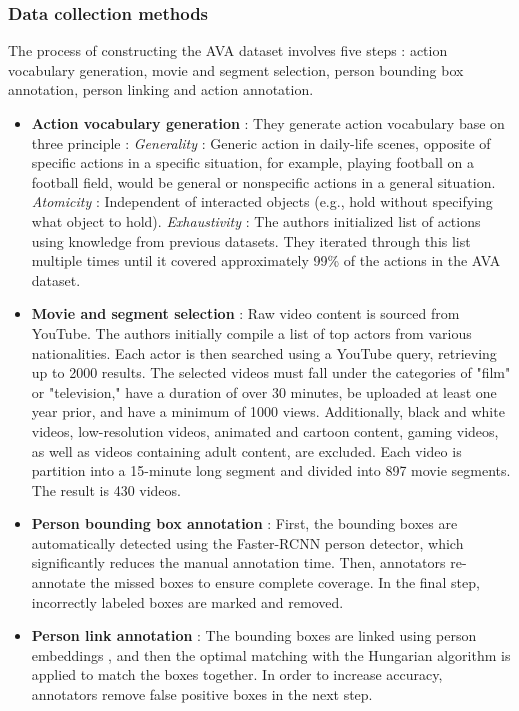 \documentclass[10pt,onecolumn,letterpaper]{article}
\begin{document}
\subsubsection{Data collection methods}

The process of constructing the AVA dataset involves five steps : action
vocabulary generation, movie and segment selection, person bounding box
annotation, person linking and action annotation.

\begin{itemize}
	\item \textbf{Action vocabulary generation} : They generate action vocabulary
	base on three principle :  
	\subitem \textit{Generality} : Generic action in daily-life scenes, opposite of
	specific actions in a specific situation, for example, playing football on a
	football field, would be general or nonspecific actions in a general situation.
	\subitem \textit{Atomicity} : Independent of interacted objects (e.g., hold
	without specifying what object to hold).
	\subitem \textit{Exhaustivity} : The authors initialized list of actions using
	knowledge
	from previous datasets. They iterated through this list multiple times until it
	covered approximately 99\% of the actions in the AVA dataset.
	
	\item \textbf{Movie and segment selection} : Raw video content is sourced from YouTube. The authors initially compile a list of top actors from various nationalities. Each actor is then searched using a YouTube query, retrieving up to 2000 results. The selected videos must fall under the categories of "film" or "television," have a duration of over 30 minutes, be uploaded at least one year prior, and have a minimum of 1000 views. Additionally, black and white videos, low-resolution videos, animated and cartoon content, gaming videos, as well as videos containing adult content, are excluded. Each video is partition into a 15-minute long segment and divided into 897 movie segments. The result is 430 videos.
	
	\item \textbf{Person bounding box annotation} : First, the bounding boxes are automatically detected using the Faster-RCNN \cite{faster-rcnn} person detector, which significantly reduces the manual annotation time. Then, annotators re-annotate the missed boxes to ensure complete coverage. In the final step, incorrectly labeled boxes are marked and removed.
	
	\item \textbf{Person link annotation} : The bounding boxes are linked using person embeddings \cite{personembedding}, and then the optimal matching with the Hungarian algorithm \cite{TheHungarian} is applied to match the boxes together. In order to increase accuracy, annotators remove false positive boxes in the next step.
	

\end{itemize}
\end{document}
